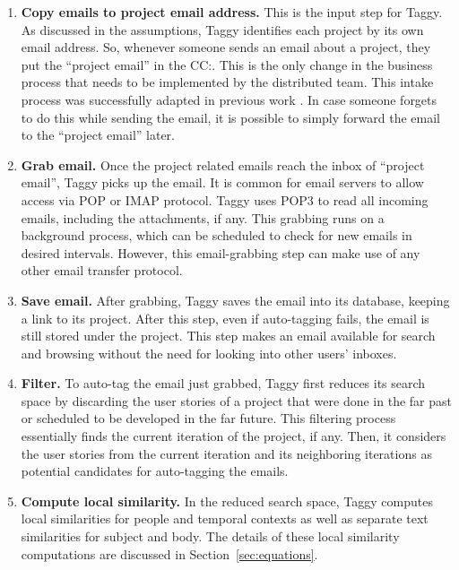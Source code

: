 \begin{enumerate}
	\item \textbf{Copy emails to project email address.} This is the input step for Taggy. As discussed in the assumptions, Taggy identifies each project by its own email address. So, whenever someone sends an email about a project, they put the ``project email'' in the CC:. This is the only change in the business process that needs to be implemented by the distributed team. This intake process was successfully adapted in previous work \cite{where_did_you}. In case someone forgets to do this while sending the email, it is possible to simply forward the email to the ``project email'' later.
	
	\item \textbf{Grab email.} Once the project related emails reach the inbox of ``project email'', Taggy picks up the email. It is common for email servers to allow access via POP or IMAP protocol. Taggy uses POP3 to read all incoming emails, including the attachments, if any. This grabbing runs on a background process, which can be scheduled to check for new emails in desired intervals. However, this email-grabbing step can make use of any other email transfer protocol.

	\item \textbf{Save email.} After grabbing, Taggy saves the email into its database, keeping a link to its project. After this step, even if auto-tagging fails, the email is still stored under the project. This step makes an email available for search and browsing without the need for looking into other users' inboxes.
	
	\item \textbf{Filter.} To auto-tag the email just grabbed, Taggy first reduces its search space by discarding the user stories of a project that were done in the far past or scheduled to be developed in the far future. This filtering process essentially finds the current iteration of the project, if any. Then, it considers the user stories from the current iteration and its neighboring iterations as potential candidates for auto-tagging the emails.

	\item \textbf{Compute local similarity.} In the reduced search space, Taggy computes local similarities for people and temporal contexts as well as separate text similarities for subject and body. The details of these local similarity computations are discussed in Section~\ref{sec:equations}.
	

\end{enumerate}
